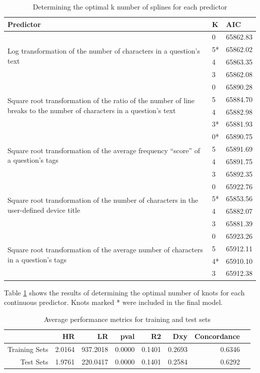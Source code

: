 \documentclass{article}
\begin{document}
\begin{table}[!htbp]
\centering
\caption{Determining the optimal k number of splines for each predictor} 
\begin{tabular}{| p{5cm} | l | l |}
  \hline
  Predictor & K & AIC \\ 
  \hline
  \multirow{ 4 }{ 5cm }{Log transformation of the number of characters in a question's text} 
  & 0 & 65862.83 \\ 
  & 5* & 65862.02 \\ 
  & 4 & 65863.35 \\ 
  & 3 & 65862.08 \\ 
  \hline
  \multirow{ 4 }{ 5 cm }{Square root transformation of the ratio of the number of line breaks to the number of characters in a question's text}
  & 0 & 65890.28 \\ 
  & 5 & 65884.70 \\ 
  & 4 & 65882.98 \\ 
  & 3* & 65881.93 \\ 
  \hline
  \multirow{ 4 }{ 5 cm }{Square root transformation of the average frequency ``score'' of a question's tags}
  & 0* & 65890.75 \\ 
  & 5 & 65891.69 \\ 
  & 4 & 65891.75 \\ 
  & 3 & 65892.35 \\ 
  \hline
  \multirow{ 4 }{ 5 cm }{Square root transformation of the number of characters in the user-defined device title}
  & 0 & 65922.76 \\ 
  & 5* & 65853.56 \\ 
  & 4 & 65882.07 \\ 
  & 3 & 65881.39 \\ 
  \hline
  \multirow{ 4 }{ 5 cm }{Square root transformation of the average number of characters in a question's tags}
  & 0 & 65923.26 \\ 
  & 5 & 65912.11 \\ 
  & 4* & 65910.10 \\ 
  & 3 & 65912.38 \\ 
   \hline
\end{tabular}
\label{table:splines}
\end{table}

Table \ref{table:splines} shows the results of determining the optimal number of knots for each continuous predictor. Knots marked * were included in the final model. 

\begin{table}[!htbp]
\centering
\caption{Average performance metrics for training and test sets} 
\begin{tabular}{rrrrrrrr}
  \hline
 & HR & LR & pval & R2 & Dxy & Concordance \\ 
  \hline
  Training Sets & 2.0164 & 937.2018 & 0.0000 & 0.1401 & 0.2693 & 0.6346 \\ 
  Test Sets & 1.9761 & 220.0417 & 0.0000 & 0.1401 & 0.2584 & 0.6292 \\
   \hline
\end{tabular}
\label{table:cv}
\end{table}
\end{document}
